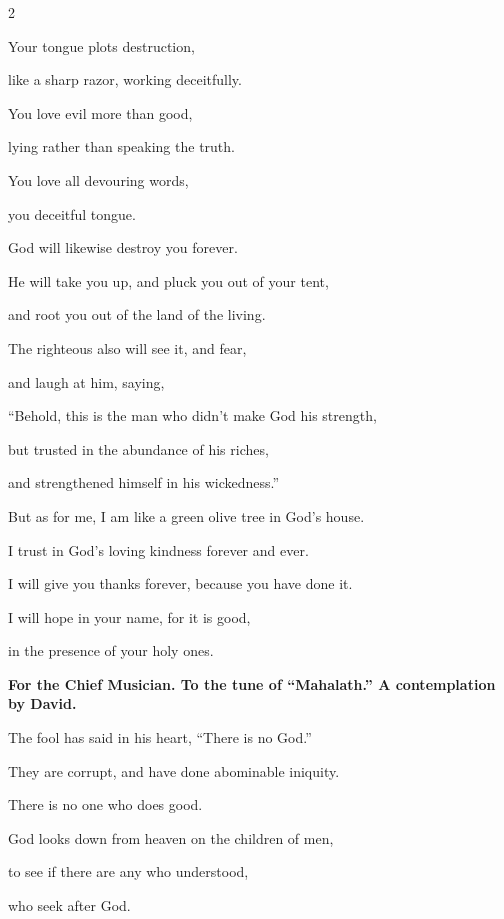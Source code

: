 \begin{multicols}{2}
	
	\myverse{}Your tongue plots destruction,
	
	like a sharp razor, working deceitfully.
	
	
	\myverse{}You love evil more than good,
	
	lying rather than speaking the truth.
	
	\vspace{\baselineskip}	
	
	\myverse{}You love all devouring words,
	
	you deceitful tongue.
	
	
	\myverse{}God will likewise destroy you forever.
	
	He will take you up, and pluck you out of your tent,
	
	and root you out of the land of the living.
	
	\vspace{\baselineskip}
	
	
	\myverse{}The righteous also will see it, and fear,
	
	and laugh at him, saying,
	
	
	\myverse{}“Behold, this is the man who didn’t make God his strength,
	
	but trusted in the abundance of his riches,
	
	and strengthened himself in his wickedness.”
	
	
	\myverse{}But as for me, I am like a green olive tree in God’s house.
	
	I trust in God’s loving kindness forever and ever.
	
	
	\myverse{}I will give you thanks forever, because you have done it.
	
	I will hope in your name, for it is good,
	
	in the presence of your holy ones.
	
	
	\mychapter{}\textbf{For the Chief Musician. To the tune of “Mahalath.” A contemplation by David.}
	
	\myverse*{}The fool has said in his heart, “There is no God.”
	
	They are corrupt, and have done abominable iniquity.
	
	There is no one who does good.
	
	
	\myverse{}God looks down from heaven on the children of men,
	
	to see if there are any who understood,
	
	who seek after God.
	

\end{multicols}
